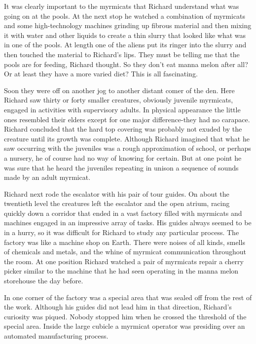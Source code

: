 \documentclass[]{article}
\begin{document}
{{It was clearly important to the myrmicats that Richard understand what was going on at the pools. At the next stop he watched a combination of myrmicats and some high-technology machines grinding up fibrous material and then mixing it with water and other liquids to create a thin slurry that looked like what was in one of the pools. At length one of the aliens put its ringer into the slurry and then touched the material to Richard’s lips. They must be telling me that the pools are for feeding, Richard thought. So they don’t eat manna melon after all? Or at least they have a more varied diet? This is all fascinating.

Soon they were off on another jog to another distant comer of the den. Here Richard saw thirty or forty smaller creatures, obviously juvenile myrmicats, engaged in activities with supervisory adults. In physical appearance the little ones resembled their elders except for one major difference-they had no carapace. Richard concluded that the hard top covering was probably not exuded by the creature until its growth was complete. Although Richard imagined that what he saw occurring with the juveniles was a rough approximation of school, or perhaps a nursery, he of course had no way of knowing for certain. But at one point he was sure that he heard the juveniles repeating in unison a sequence of sounds made by an adult myrmicat.

Richard next rode the escalator with his pair of tour guides. On about the twentieth level the creatures left the escalator and the open atrium, racing quickly down a corridor that ended in a vast factory filled with myrmicats and machines engaged in an impressive array of tasks. His guides always seemed to be in a hurry, so it was difficult for Richard to study any particular process. The factory was like a machine shop on Earth. There were noises of all kinds, smells of chemicals and metals, and the whine of myrmicat communication throughout the room. At one position Richard watched a pair of myrmicats repair a cherry picker similar to the machine that he had seen operating in the manna melon storehouse the day before.

In one corner of the factory was a special area that was sealed off from the rest of the work. Although his guides did not lead him in that direction, Richard’s curiosity was piqued. Nobody stopped him when he crossed the threshold of the special area. Inside the large cubicle a myrmicat operator was presiding over an automated manufacturing process.

}}
\end{document}
